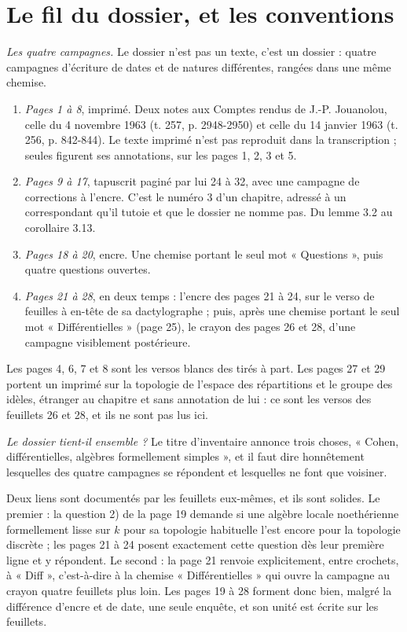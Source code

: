 \documentclass[11pt,a4paper]{article}
\begin{document}
\section*{Le fil du dossier, et les conventions}

\emph{Les quatre campagnes.} Le dossier n'est pas un texte, c'est un dossier :
quatre campagnes d'écriture de dates et de natures différentes, rangées dans
une même chemise.

\begin{enumerate}
  \item \emph{Pages 1 à 8}, imprimé. Deux notes aux Comptes rendus de
  J.-P. Jouanolou, celle du 4 novembre 1963 (t. 257, p. 2948-2950) et celle du
  14 janvier 1963 (t. 256, p. 842-844). Le texte imprimé n'est pas reproduit
  dans la transcription ; seules figurent ses annotations, sur les pages 1, 2,
  3 et 5.
  \item \emph{Pages 9 à 17}, tapuscrit paginé par lui 24 à 32, avec une
  campagne de corrections à l'encre. C'est le numéro 3 d'un chapitre, adressé à
  un correspondant qu'il tutoie et que le dossier ne nomme pas. Du lemme 3.2
  au corollaire 3.13.
  \item \emph{Pages 18 à 20}, encre. Une chemise portant le seul mot
  « Questions », puis quatre questions ouvertes.
  \item \emph{Pages 21 à 28}, en deux temps : l'encre des pages 21 à 24, sur
  le verso de feuilles à en-tête de sa dactylographe ; puis, après une chemise
  portant le seul mot « Différentielles » (page 25), le crayon des pages 26 et
  28, d'une campagne visiblement postérieure.
\end{enumerate}

Les pages 4, 6, 7 et 8 sont les versos blancs des tirés à part. Les pages 27 et
29 portent un imprimé sur la topologie de l'espace des répartitions et le
groupe des idèles, étranger au chapitre et sans annotation de lui : ce sont les
versos des feuillets 26 et 28, et ils ne sont pas lus ici.

\emph{Le dossier tient-il ensemble ?} Le titre d'inventaire annonce trois
choses, « Cohen, différentielles, algèbres formellement simples », et il faut
dire honnêtement lesquelles des quatre campagnes se répondent et lesquelles ne
font que voisiner.

Deux liens sont documentés par les feuillets eux-mêmes, et ils sont solides. Le
premier : la question 2) de la page 19 demande si une algèbre locale
noethérienne formellement lisse sur $k$ pour sa topologie habituelle l'est
encore pour la topologie discrète ; les pages 21 à 24 posent exactement cette
question dès leur première ligne et y répondent. Le second : la page 21 renvoie
explicitement, entre crochets, à « Diff », c'est-à-dire à la chemise
« Différentielles » qui ouvre la campagne au crayon quatre feuillets plus loin.
Les pages 19 à 28 forment donc bien, malgré la différence d'encre et de date,
une seule enquête, et son unité est écrite sur les feuillets.
\end{document}
